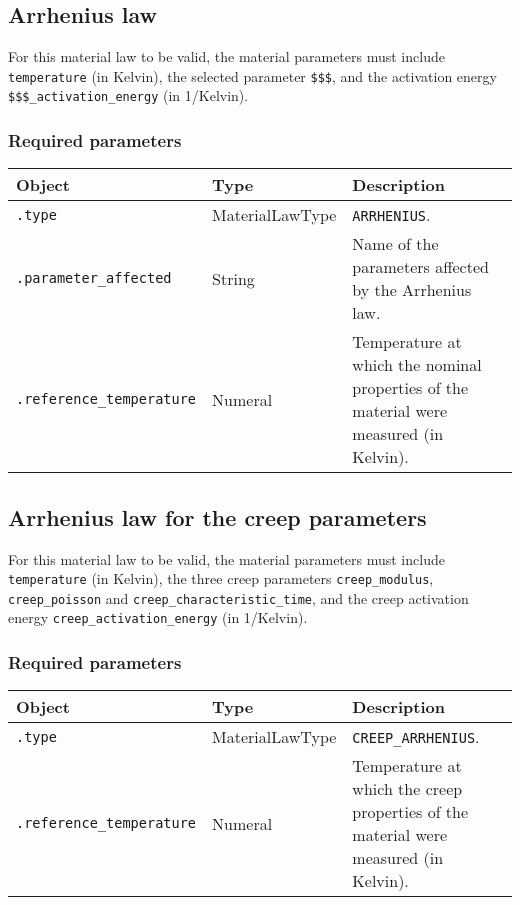 \documentclass[10pt]{article}
\begin{document}
\subsection{Arrhenius law}

For this material law to be valid, the material parameters must include \verb+temperature+ (in Kelvin), the selected parameter \verb+$$$+, and the activation energy \verb+$$$_activation_energy+ (in 1/Kelvin).

\subsubsection*{Required parameters}

\begin{tabularx}{\textwidth}{llX}
\hline 
Object & Type & Description \\ 
\hline 
\verb+.type+ & MaterialLawType & \verb+ARRHENIUS+. \\ 
\verb+.parameter_affected+ & String & Name of the parameters affected by the Arrhenius law. \\
\verb+.reference_temperature+ & Numeral & Temperature at which the nominal properties of the material were measured (in Kelvin). \\ 
\hline 
\end{tabularx}

\subsection{Arrhenius law for the creep parameters}

For this material law to be valid, the material parameters must include \verb+temperature+ (in Kelvin), the three creep parameters \verb+creep_modulus+, \verb+creep_poisson+ and \verb+creep_characteristic_time+, and the creep activation energy \verb+creep_activation_energy+ (in 1/Kelvin).

\subsubsection*{Required parameters}

\begin{tabularx}{\textwidth}{llX}
\hline 
Object & Type & Description \\ 
\hline 
\verb+.type+ & MaterialLawType & \verb+CREEP_ARRHENIUS+. \\ 
\verb+.reference_temperature+ & Numeral & Temperature at which the creep properties of the material were measured (in Kelvin). \\ 
\hline 
\end{tabularx}
\end{document}
